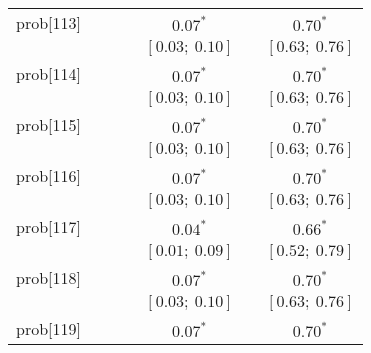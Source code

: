 \begin{table}
\begin{center}
\begin{tabular}{l c c c c c c }
prob[113] &                           &                           &                           & $0.07^{*}$              &                           & $0.70^{*}$            \\
          &                           &                           &                           & $[0.03;\ 0.10]$         &                           & $[0.63;\ 0.76]$       \\
prob[114] &                           &                           &                           & $0.07^{*}$              &                           & $0.70^{*}$            \\
          &                           &                           &                           & $[0.03;\ 0.10]$         &                           & $[0.63;\ 0.76]$       \\
prob[115] &                           &                           &                           & $0.07^{*}$              &                           & $0.70^{*}$            \\
          &                           &                           &                           & $[0.03;\ 0.10]$         &                           & $[0.63;\ 0.76]$       \\
prob[116] &                           &                           &                           & $0.07^{*}$              &                           & $0.70^{*}$            \\
          &                           &                           &                           & $[0.03;\ 0.10]$         &                           & $[0.63;\ 0.76]$       \\
prob[117] &                           &                           &                           & $0.04^{*}$              &                           & $0.66^{*}$            \\
          &                           &                           &                           & $[0.01;\ 0.09]$         &                           & $[0.52;\ 0.79]$       \\
prob[118] &                           &                           &                           & $0.07^{*}$              &                           & $0.70^{*}$            \\
          &                           &                           &                           & $[0.03;\ 0.10]$         &                           & $[0.63;\ 0.76]$       \\
prob[119] &                           &                           &                           & $0.07^{*}$              &                           & $0.70^{*}$            \\

\end{tabular}
\end{center}
\end{table}
